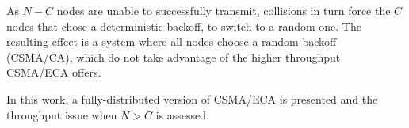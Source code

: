 As $N-C$ nodes are unable to successfully transmit, collisions in turn force the $C$ nodes that chose a deterministic backoff, to switch to a random one. The resulting effect is a system where all nodes choose a random backoff (CSMA/CA), which do not take advantage of the higher throughput CSMA/ECA offers.


In this work, a fully-distributed version of CSMA/ECA is presented and the throughput issue when $N>C$ is assessed.